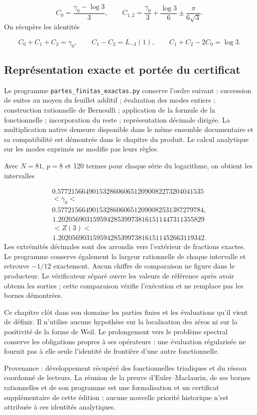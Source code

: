 \[
C_0=\frac{\gamma_0-\log3}{3},\qquad
C_{1,2}=\frac{\gamma_0}{3}+\frac{\log3}{6}
\mathbin{\pm}\frac{\pi}{6\sqrt3}.
\]
On récupère les identités

\[
C_0+C_1+C_2=\gamma_0,\qquad
C_1-C_2=L_{-3}(1),\qquad C_1+C_2-2C_0=\log3.
\]
\clearpage
\subsection{Représentation exacte et portée du certificat}
Le programme \texttt{partes\_\allowbreak{}finitas\_\allowbreak{}exactas.\allowbreak{}py} conserve l'ordre suivant : succession de suites au moyen du feuillet additif ; évaluation des modes entiers ; construction rationnelle de Bernoulli ; application de la formule de la fonctionnelle ; incorporation du reste ; représentation décimale dirigée. La multiplication native demeure disponible dans le même ensemble documentaire et sa compatibilité est démontrée dans le chapitre du produit. Le calcul analytique sur les modes exprimés ne modifie pas leurs règles.

Avec \(N=81\), \(p=8\) et 120 termes pour chaque série du logarithme, on obtient les intervalles

\[
\begin{gathered}
0.577215664901532860606512090082273204041535\\
<\gamma_0<\\
0.577215664901532860606512090082531387279784,
\end{gathered}
\]
\[
\begin{gathered}
1.202056903159594285399738161511447311355829\\
<Z(3)<\\
1.202056903159594285399738161511452663119342.
\end{gathered}
\]
Les extrémités décimales sont des arrondis vers l’extérieur de fractions exactes. Le programme conserve également la largeur rationnelle de chaque intervalle et retrouve \(-1/12\) exactement. Aucun chiffre de comparaison ne figure dans le producteur. Le vérificateur séparé ouvre les valeurs de référence après avoir obtenu les sorties ; cette comparaison vérifie l’exécution et ne remplace pas les bornes démontrées.

Ce chapitre clôt dans son domaine les parties finies et les évaluations qu'il vient de définir. Il n'utilise aucune hypothèse sur la localisation des zéros ni sur la positivité de la forme de Weil. Le prolongement vers le problème spectral conserve les obligations propres à ses opérateurs : une évaluation régularisée ne fournit pas à elle seule l'identité de frontière d'une autre fonctionnelle.

Provenance : développement récupéré des fonctionnelles triadiques et du réseau coordonné de lecteurs. La réunion de la preuve d’Euler–Maclaurin, de ses bornes rationnelles et de son programme est une formalisation et un certificat supplémentaire de cette édition ; aucune nouvelle priorité historique n’est attribuée à ces identités analytiques.
